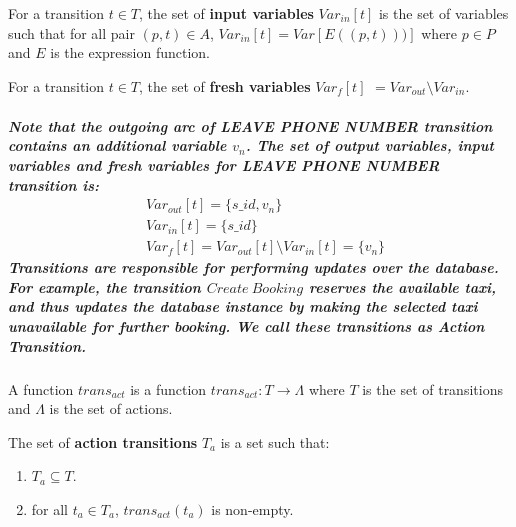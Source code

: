 \begin{defs}
	For a transition $\mathit{t \in T}$, the set of \textbf{input variables} $\mathit{Var_{in}[t]}$ is the set of variables such that for all pair $\mathit{(p,t) \in A}$, $\mathit{Var_{in}[t] = Var[E((p,t)))]}$ where $\mathit{p \in P}$ and $\mathit{E}$ is the expression function.
\end{defs}

\begin{defs}
	For a transition $\mathit{t \in T}$, the set of \textbf{fresh variables} $\mathit{Var_{f}[t]}$ $\mathit{= Var_{out} \setminus Var_{in}}$.
\end{defs}

\subparagraph*{\textnormal{Note that the outgoing arc of \textit{LEAVE PHONE NUMBER} transition contains an additional variable $v_{n}$. The set of \textit{output variables}, \textit{input variables} and \textit{fresh variables} for \textit{LEAVE PHONE NUMBER} transition is:
\begin{equation*}
\begin{aligned}
&Var_{out}[t] = \{s\_id,v_{n} \} \\
&Var_{in}[t] = \{s\_id\} \\
&Var_{f}[t] = Var_{out}[t] \setminus Var_{in}[t] = \{v_{n}\}
\end{aligned}
\end{equation*}
Transitions are responsible for performing updates over the database. For example, the transition $\mathit{Create\ Booking}$ reserves the available taxi, and thus updates the database instance by making the selected taxi unavailable for further booking. We call these transitions as \textit{Action Transition}.}}

\begin{defs}
	\label{defs:DBN_transition_action_function}
	A function $\mathit{trans_{act}}$ is a function $\mathit{trans_{act} : T \rightarrow \Lambda}$ where $\mathit{T}$ is the set of transitions and $\mathit{\Lambda}$ is the set of actions.
\end{defs}
\begin{defs}
	\label{defs:dbn_formal_action_transition}
	The set of \textbf{action transitions} $\mathit{T_{a}}$ is a set such that:
	\begin{enumerate}
		\item $\mathit{T_{a} \subseteq T}$.
		\item for all $\mathit{t_{a} \in T_{a}}$, $\mathit{trans_{act}(t_{a})}$ is non-empty.
	\end{enumerate}
\end{defs}

